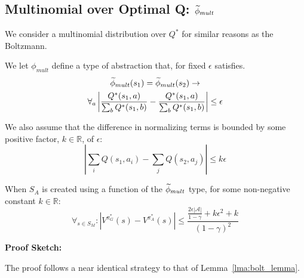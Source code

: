 \subsection{Multinomial over Optimal Q: $\widetilde \phi_{mult}$}
\label{sec:mult}

We consider a multinomial distribution over $Q^*$ for similar reasons as the Boltzmann.

We let $\phi_{mult}$ define a type of abstraction that, for fixed $\epsilon$ satisfies.
\begin{multline}
\widetilde \phi_{mult}(s_1) = \widetilde \phi_{mult}(s_2) \rightarrow \\
\forall_{a} \left|\frac{Q^*(s_1,a)}{\sum_b Q^*(s_1,b)} - \frac{Q^*(s_1,a)}{\sum_b Q^*(s_1,b)}\right| \leq \epsilon
\end{multline}
\edefn

We also assume that the difference in normalizing terms is bounded by some positive factor, $k \in \mathbb{R}$, of $\epsilon$:
\begin{equation}
|\sum_i Q(s_1,a_i) - \sum_j Q(s_2,a_j) | \leq k\epsilon
\end{equation}

\begin{lma} When $S_A$ is created using a function of the $\widetilde \phi_{mult}$ type, for some non-negative constant $k \in \mathbb{R}$:
\begin{equation}
\forall_{s \in S_M} : | V^{\pi^*_G}(s) - V^{\pi^*_{A}}(s) | \leq \frac{\frac{2\epsilon|\mathcal{A}|}{1-\gamma} + k \epsilon^2 + k}{(1-\gamma)^2}
\end{equation}
\end{lma}

{\bf Proof Sketch:}

The proof follows a near identical strategy to that of Lemma~\ref{lma:bolt_lemma}.



